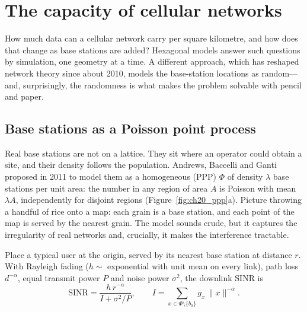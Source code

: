 \section{The capacity of cellular networks}
\label{sec:ch20:capacity}

How much data can a cellular network carry per square kilometre, and how does that change as base stations are
added? Hexagonal models answer such questions by simulation, one geometry at a time. A different approach, which
has reshaped network theory since about 2010, models the base-station locations as random---and, surprisingly,
the randomness is what makes the problem solvable with pencil and paper.

\subsection{Base stations as a Poisson point process}

Real base stations are not on a lattice. They sit where an operator could obtain a site, and their density follows
the population. Andrews, Baccelli and Ganti proposed in 2011 to model them as a homogeneous  (PPP) $\Phi$ of density $\lambda$ base stations per unit area: the number in any region of area $A$ is Poisson
with mean $\lambda A$, independently for disjoint regions (Figure~\ref{fig:ch20_ppp}a). Picture throwing a handful of
rice onto a map: each grain is a base station, and each point of the map is served by the nearest grain. The model
sounds crude, but it captures the irregularity of real networks and, crucially, it makes the interference tractable.

Place a typical user at the origin, served by its nearest base station at distance $r$. With Rayleigh fading
($h\sim$ exponential with unit mean on every link), path loss $d^{-\alpha}$, equal transmit power $P$ and noise power
$\sigma^2$, the downlink SINR is
\begin{equation}
\mathrm{SINR}=\frac{h\,r^{-\alpha}}{I+\sigma^2/P},\qquad
I=\sum_{x\in\Phi\setminus\{b_0\}}g_x\,\|x\|^{-\alpha}.
\end{equation}

